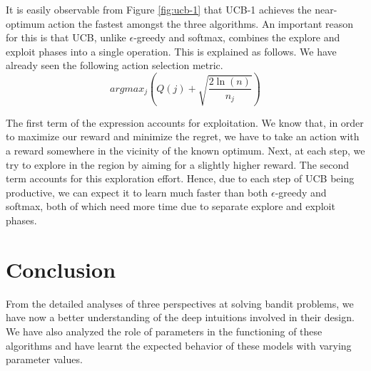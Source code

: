\documentclass[12pt]{extarticle}
\begin{document}
It is easily observable from Figure \ref{fig:ucb-1} that UCB-1 achieves the near-optimum action the fastest amongst the three algorithms. An important reason for this is that UCB, unlike $\epsilon$-greedy and softmax, combines the explore and exploit phases into a single operation. This is explained as follows. We have already seen the following action selection metric.\\

\begin{equation*}
argmax_j \left(Q(j) + \sqrt{\frac{2\ln(n)}{n_j}}\right)
\end{equation*}

The first term of the expression accounts for exploitation. We know that, in order to maximize our reward and minimize the regret, we have to take an action with a reward somewhere in the vicinity of the known optimum. Next, at each step, we try to explore in the region by aiming for a slightly higher reward. The second term accounts for this exploration effort. Hence, due to each step of UCB being productive, we can expect it to learn much faster than both $\epsilon$-greedy and softmax, both of which need more time due to separate explore and exploit phases.\\

\section{Conclusion}
From the detailed analyses of three perspectives at solving bandit problems, we have now a better understanding of the deep intuitions involved in their design. We have also analyzed the role of parameters in the functioning of these algorithms and have learnt the expected behavior of these models with varying parameter values.\\



\end{document}
